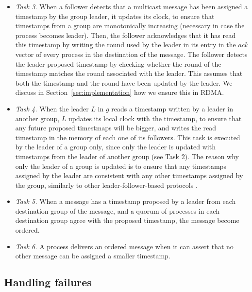 \begin{itemize}
\item \emph{Task 3.} When a follower detects that a multicast message has been assigned a timestamp by the group leader, it updates its clock, to ensure that timestamps from a group are monotonically increasing (necessary in case the process becomes leader).
Then, the follower acknowledges that it has read this timestamp by writing the round used by the leader in its entry in the $ack$ vector of every process in the destination of the message.
The follower detects the leader proposed timestamp by checking whether the round of the timestamp matches the round associated with the  leader. 
This assumes that both the timestamp and the round have been updated by the leader.
We discuss in Section~\ref{sec:implementation} how we ensure this in RDMA.

\item \emph{Task 4.} 
When the leader $L$ in $g$ reads a timestamp written by a leader in another group, $L$ updates its local clock with the timestamp, to ensure that any future proposed timestmaps will be bigger, and writes the read timestamp in the memory of each one of its followers.
This task is executed by the leader of a group only, since only the leader is updated with timestamps from the leader of another group (see Task 2).
The reason why only the leader of a group is updated is to ensure that any timestamps assigned by the leader are consistent with any other timestamps assigned by the group, similarly to other leader-follower-based protocols \cite{gotsman2019white, Junqueira2011}.

\item \emph{Task 5.} 
When a message has a timestamp proposed by a leader from each destination group of the message, and a quorum of processes in each destination group agree with the proposed timestamp, the message become ordered.

\item \emph{Task 6.} 
A process delivers an ordered message when it can assert that no other message can be assigned a smaller timestamp.

\end{itemize}

\subsection{Handling failures}
\label{sec:failurecase}

